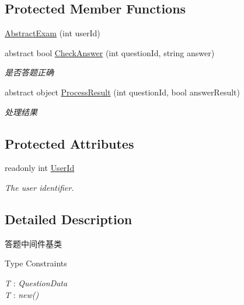 \subsection*{Protected Member Functions}
\begin{DoxyCompactItemize}
\item 
\mbox{\hyperlink{class_t_net_1_1_com_1_1_exam_1_1_abstract_exam_acce351b521a6313beced5eb3d2d86a6b}{Abstract\+Exam}} (int user\+Id)
\item 
abstract bool \mbox{\hyperlink{class_t_net_1_1_com_1_1_exam_1_1_abstract_exam_a98039563cff59a78dd2f9bb3d1036123}{Check\+Answer}} (int question\+Id, string answer)
\begin{DoxyCompactList}\small\item\em 是否答题正确 \end{DoxyCompactList}\item 
abstract object \mbox{\hyperlink{class_t_net_1_1_com_1_1_exam_1_1_abstract_exam_a3c5fa53128bdf41dc51686e299b52aa4}{Process\+Result}} (int question\+Id, bool answer\+Result)
\begin{DoxyCompactList}\small\item\em 处理结果 \end{DoxyCompactList}\end{DoxyCompactItemize}
\subsection*{Protected Attributes}
\begin{DoxyCompactItemize}
\item 
readonly int \mbox{\hyperlink{class_t_net_1_1_com_1_1_exam_1_1_abstract_exam_a6da2ee3a695db3248702ca932298e70a}{User\+Id}}
\begin{DoxyCompactList}\small\item\em The user identifier. \end{DoxyCompactList}\end{DoxyCompactItemize}


\subsection{Detailed Description}
答题中间件基类 

\begin{Desc}
\item[Type Constraints]\begin{description}
\item[{\em T} : {\em Question\+Data}]\item[{\em T} : {\em new()}]\end{description}
\end{Desc}


